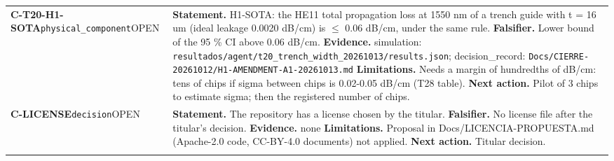 \begin{longtable}{@{}>{\raggedright\arraybackslash}p{2.35cm}>{\raggedright\arraybackslash}p{13.2cm}@{}}
\textbf{C-T20-H1-SOTA}\newline \texttt{physical\_\allowbreak{}component}\newline OPEN & \textbf{Statement.} H1-SOTA: the HE11 total propagation loss at 1550 nm of a trench guide with t = 16 um (ideal leakage 0.0020 dB/\allowbreak{}cm) is $\le$ 0.06 dB/\allowbreak{}cm, under the same rule. \newline \textbf{Falsifier.} Lower bound of the 95 \% CI above 0.06 dB/\allowbreak{}cm. \newline \textbf{Evidence.} simulation: \texttt{resultados/\allowbreak{}agent/\allowbreak{}t20\_\allowbreak{}trench\_\allowbreak{}width\_\allowbreak{}20261013/\allowbreak{}results.json}; decision\_\allowbreak{}record: \texttt{Docs/\allowbreak{}CIERRE-20261012/\allowbreak{}H1-AMENDMENT-A1-20261013.md} \newline \textbf{Limitations.} Needs a margin of hundredths of dB/\allowbreak{}cm: tens of chips if sigma between chips is 0.02-0.05 dB/\allowbreak{}cm (T28 table). \newline \textbf{Next action.} Pilot of 3 chips to estimate sigma; then the registered number of chips. \\ \addlinespace[2pt]
\textbf{C-LICENSE}\newline \texttt{decision}\newline OPEN & \textbf{Statement.} The repository has a license chosen by the titular. \newline \textbf{Falsifier.} No license file after the titular's decision. \newline \textbf{Evidence.} none \newline \textbf{Limitations.} Proposal in Docs/\allowbreak{}LICENCIA-PROPUESTA.md (Apache-2.0 code, CC-BY-4.0 documents) not applied. \newline \textbf{Next action.} Titular decision. \\ \addlinespace[2pt]
\end{longtable}
